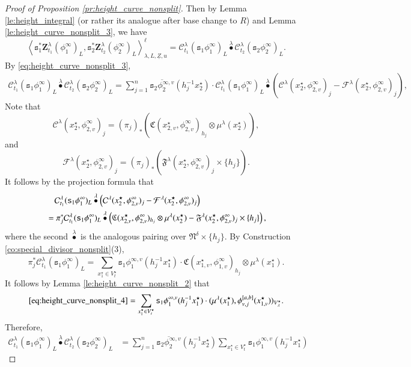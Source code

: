 \documentclass[12pt]{amsart}
\numberwithin{equation}{section}
\theoremstyle{plain}
\theoremstyle{definition}
\theoremstyle{remark}
\renewcommand{\c}[1]{\mathcal{#1}}
\newcommand{\f}[1]{\mathfrak{#1}}
\renewcommand{\(}{\left(}
\renewcommand{\)}{\right)}
\newcommand{\ol}[1]{\overline{#1}{}}
\newcommand{\ul}{\underline}
\newcommand{\cC}{\c C}
\newcommand{\cF}{\c F}
\newcommand{\fC}{\f C}
\newcommand{\fF}{\f F}
\newcommand{\fN}{\f N}
\newcommand{\ts}{\mathtt{s}}
\newcommand{\bbZ}{\boldsymbol{Z}}
\newcommand{\llangle}{\left\langle}
\newcommand{\rrangle}{\right\rangle}
\begin{document}
\begin{proof}[Proof of Proposition \ref{pr:height_curve_nonsplit}]
Then by Lemma \ref{le:height_integral} (or rather its analogue after base change to $R$) and Lemma \ref{le:height_curve_nonsplit_3}, we have
\[
\llangle\ts_1^*\bbZ^\lambda_{t_1}(\phi^\infty_1)_L,\ts_2^*\bbZ^\lambda_{t_2}(\phi^\infty_2)_L\rrangle_{\lambda,L,\ul{Z},u}^\ell
=\cC^\lambda_{t_1}(\ts_1\phi^\infty_1)_L\overset{\lambda}\bullet\cC^\lambda_{t_2}(\ts_2\phi^\infty_2)_L.
\]
By \eqref{eq:height_curve_nonsplit_3},
\begin{align*}
\cC^\lambda_{t_1}(\ts_1\phi^\infty_1)_L\overset{\lambda}\bullet\cC^\lambda_{t_2}(\ts_2\phi^\infty_2)_L=
\sum_{j=1}^n\ol{\ts_2\phi^{\infty,v}_2}(h_j^{-1}x^\star_2)\cdot
\cC^\lambda_{t_1}(\ts_1\phi^\infty_1)_L\overset{\lambda}\bullet
\(\cC^\lambda(x^\star_2,\phi^\infty_{2,v})_j-\cF^\lambda(x^\star_2,\phi^\infty_{2,v})_j\),
\end{align*}
Note that
\[
\cC^\lambda(x^\star_2,\phi^\infty_{2,v})_j=
(\pi_j)_*\(\fC(x^\star_{2,v},\phi^\infty_{2,v})_{h_j}\otimes\mu^\lambda(x^\star_2)\),
\]
and
\[
\cF^\lambda(x^\star_2,\phi^\infty_{2,v})_j=(\pi_j)_*\(\fF^\lambda(x^\star_2,\phi^\infty_{2,v})_j\times\{h_j\}\).
\]
It follows by the projection formula that
\begin{align}\label{eq:height_curve_nonsplit_4}
&\quad\cC^\lambda_{t_1}(\ts_1\phi^\infty_1)_L\overset{\lambda}\bullet
\(\cC^\lambda(x^\star_2,\phi^\infty_{2,v})_j-\cF^\lambda(x^\star_2,\phi^\infty_{2,v})_j\) \\
&=\pi_j^*\cC^\lambda_{t_1}(\ts_1\phi^\infty_1)_L\overset{\lambda}\bullet
\(\fC(x^\star_{2,v},\phi^\infty_{2,v})_{h_j}\otimes\mu^\lambda(x^\star_2)
-\fF^\lambda(x^\star_2,\phi^\infty_{2,v})_j\times\{h_j\}\), \notag
\end{align}
where the second $\overset{\lambda}\bullet$ is the analogous pairing over $\fN^\delta\times\{h_j\}$. By Construction \ref{co:special_divisor_nonsplit}(3),
\[
\pi_j^*\cC^\lambda_{t_1}(\ts_1\phi^\infty_1)_L=\sum_{x^\star_1\in V^\star_t}
\ts_1\phi^{\infty,v}_1(h_j^{-1}x^\star_1)\cdot\fC(x^\star_{1,v},\phi^\infty_{1,v})_{h_j}\otimes\mu^\lambda(x^\star_1).
\]
It follows by Lemma \ref{le:height_curve_nonsplit_2} that
\[
\eqref{eq:height_curve_nonsplit_4}=\sum_{x^\star_1\in V^\star_t}
\ts_1\phi^{\infty,v}_1(h_j^{-1}x^\star_1)\cdot(\mu^\lambda(x^\star_1),\phi^{[a,b]}_{v,j}(x^\star_{1,v}))_{V^\star_\lambda}.
\]
Therefore,
\begin{align*}
\cC^\lambda_{t_1}(\ts_1\phi^\infty_1)_L\overset{\lambda}\bullet\cC^\lambda_{t_2}(\ts_2\phi^\infty_2)_L
&=\sum_{j=1}^n\ol{\ts_2\phi^{\infty,v}_2}(h_j^{-1}x^\star_2)\sum_{x^\star_1\in V^\star_t}
\ts_1\phi^{\infty,v}_1(h_j^{-1}x^\star_1)

\end{align*}
\end{proof}
\end{document}
